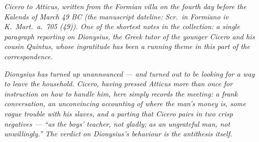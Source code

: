 
\textit{Cicero to Atticus, written from the Formian
villa on the fourth day before the Kalends of March 49
BC (the manuscript dateline: \textit{Scr.\ in Formiano
iv K.\ Mart.\ a.\ 705 (49)}). One of the shortest
notes in the collection: a single paragraph reporting
on Dionysius, the Greek tutor of the younger Cicero
and his cousin Quintus, whose ingratitude has been a
running theme in this part of the correspondence.}

\textit{Dionysius has turned up unannounced --- and
turned out to be looking for a way to leave the
household. Cicero, having pressed Atticus more than
once for instruction on how to handle him, here simply
records the meeting: a frank conversation, an
unconvincing accounting of where the man's money is,
some vague trouble with his slaves, and a parting that
Cicero pairs in two crisp negatives --- ``as the boys'
teacher, not gladly; as an ungrateful man, not
unwillingly.'' The verdict on Dionysius's behaviour is
the antithesis itself.}
